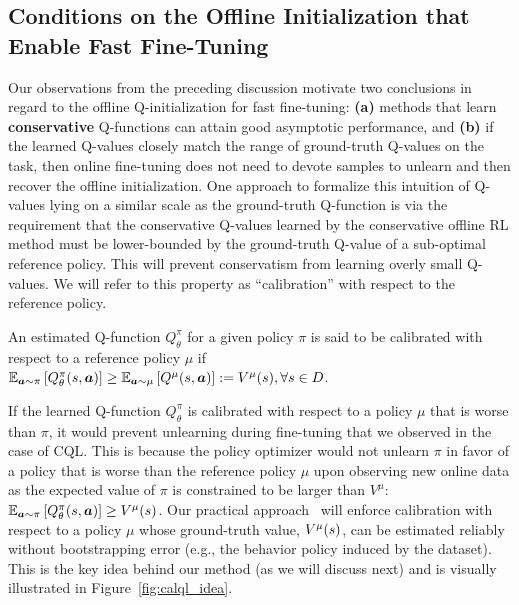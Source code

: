 \vspace{-0.2cm}
\subsection{Conditions on the Offline Initialization that Enable Fast Fine-Tuning}
\vspace{-0.18cm}
Our observations from the preceding discussion motivate two conclusions in regard to the offline Q-initialization for fast fine-tuning: \textbf{(a)} methods that learn \textbf{conservative} Q-functions can attain good asymptotic performance, and \textbf{(b)} if the learned Q-values closely match the range of ground-truth Q-values on the task, then online fine-tuning does not need to devote samples to unlearn and then recover the offline initialization. One approach to formalize this intuition of Q-values lying on a similar scale as the ground-truth Q-function is via the requirement that the conservative Q-values learned by the conservative offline RL method must be lower-bounded by the ground-truth Q-value of a sub-optimal reference policy. This will prevent conservatism from learning overly small Q-values. We will refer to this property as ``calibration'' with respect to the reference policy.
\begin{definition}[Calibration]
\label{cond:calibration}
An estimated Q-function ${Q}_\theta^\pi$ for a given policy $\pi$ is said to be calibrated with respect to a reference policy $\mu$ if $\mathbb{E}_{\boldsymbol{a} \sim \pi}\left[Q_\theta^\pi(s, \boldsymbol{a})\right] \geq \mathbb{E}_{\boldsymbol{a} \sim \mu}\left[Q^\mu(s, \boldsymbol{a})\right] := V^\mu(s), \forall s \in \mathcal \mathcal{D}$.
\end{definition}

If the learned Q-function ${Q}^\pi_\theta$ is calibrated with respect to a policy $\mu$ that is worse than $\pi$, it would prevent unlearning during fine-tuning that we observed in the case of CQL.
This is because the policy optimizer would not unlearn $\pi$ in favor of a policy that is worse than the reference policy $\mu$ upon observing new online data as the expected value of $\pi$ is constrained to be larger than $V^\mu$: $\mathbb{E}_{\boldsymbol{a} \sim \pi}\left[{Q}^\pi_\theta(s, \boldsymbol{a})\right] \geq V^\mu(s)$.
Our practical approach \methodname\ will enforce calibration with respect to a policy $\mu$ whose ground-truth value, $V^\mu(s)$, can be estimated reliably without bootstrapping error (e.g., the behavior policy induced by the dataset). This is the key idea behind our method (as we will discuss next) and is visually illustrated in Figure~\ref{fig:calql_idea}.

\vspace{-0.2cm}